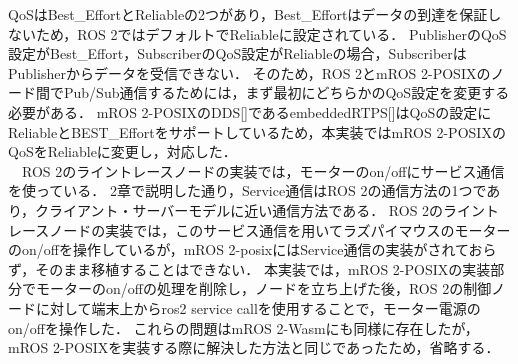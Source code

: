 QoSはBest\_EffortとReliableの2つがあり，Best\_Effortはデータの到達を保証しないため，ROS 2ではデフォルトでReliableに設定されている．
PublisherのQoS設定がBest\_Effort，SubscriberのQoS設定がReliableの場合，SubscriberはPublisherからデータを受信できない．
そのため，ROS 2とmROS 2-POSIXのノード間でPub/Sub通信するためには，まず最初にどちらかのQoS設定を変更する必要がある．
mROS 2-POSIXのDDS[]であるembeddedRTPS[]はQoSの設定にReliableとBEST\_Effortをサポートしているため，本実装ではmROS 2-POSIXのQoSをReliableに変更し，対応した．
\\　ROS 2のライントレースノードの実装では，モーターのon/offにサービス通信を使っている．
2章で説明した通り，Service通信はROS 2の通信方法の1つであり，クライアント・サーバーモデルに近い通信方法である．
ROS 2のライントレースノードの実装では，このサービス通信を用いてラズパイマウスのモーターのon/offを操作しているが，mROS 2-posixにはService通信の実装がされておらず，そのまま移植することはできない．
本実装では，mROS 2-POSIXの実装部分でモーターのon/offの処理を削除し，ノードを立ち上げた後，ROS 2の制御ノードに対して端末上からros2 service callを使用することで，モーター電源のon/offを操作した．
これらの問題はmROS 2-Wasmにも同様に存在したが，mROS 2-POSIXを実装する際に解決した方法と同じであったため，省略する．
